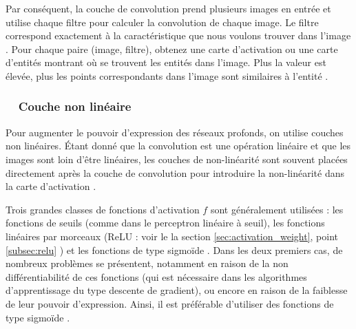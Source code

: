 

Par conséquent, la couche de convolution prend plusieurs images en entrée  et utilise chaque filtre pour calculer la convolution de  chaque image. Le filtre correspond exactement à la caractéristique que nous voulons trouver dans l'image \cite{shin2016deep}. 
Pour chaque paire (image, filtre), obtenez une carte d'activation ou une carte d'entités montrant où se trouvent les entités dans l'image. Plus la valeur est élevée, plus les points correspondants dans l'image sont similaires à l'entité \cite{goodfellow2016deep}.



\subsubsection*{\qquad \textbullet \ \ Couche non linéaire}

Pour augmenter le pouvoir d'expression des réseaux profonds, on utilise couches non linéaires\cite{antoine2018apprentissage}.
Étant donné que la convolution est une opération linéaire et que les images sont loin d'être linéaires, les couches de non-linéarité sont souvent placées directement après la couche de convolution pour introduire la non-linéarité dans la carte d'activation \cite{goodfellow2016deep}.

Trois grandes classes de fonctions d'activation $f$ sont généralement utilisées : les fonctions de seuils (comme dans le perceptron linéaire à seuil), les fonctions linéaires par morceaux (ReLU : voir le la section \ref{sec:activation_weight}, point \ref{subsec:relu} ) et les fonctions de type sigmoïde \cite{goodfellow2016deep}. Dans les deux premiers cas, de nombreux problèmes se présentent, notamment en raison de la non différentiabilité de ces fonctions (qui est nécessaire dans les algorithmes d'apprentissage du type descente de gradient), ou encore en raison de la faiblesse de leur pouvoir d'expression. Ainsi, il est préférable d'utiliser des fonctions de type sigmoïde \cite{antoine2018apprentissage}.


